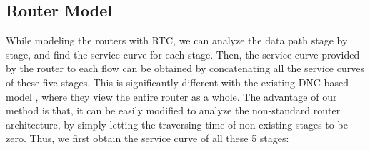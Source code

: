 \documentclass[10pt,journal]{IEEEtran}
\begin{document}
\subsection{Router Model}\label{router}
While modeling the routers with RTC, we can analyze the data path stage by stage, and find the service curve for each stage. Then, the service curve provided by the router to each flow can be obtained by concatenating all the service curves of these five stages. This is significantly different with the existing DNC based model \cite{Qian2010Analysis,Qian489900}, where they view the entire router as a whole. The advantage of our method is that, it can be easily modified to analyze the non-standard router architecture, by simply letting the traversing time of non-existing stages to be zero. Thus, we first obtain the service curve of all these 5 stages:
\begin{figure}
  \centering
  \hspace{10pt}

\end{figure}
\end{document}
